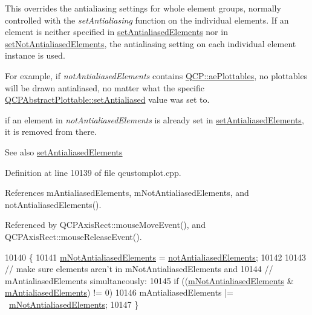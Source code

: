 This overrides the antialiasing settings for whole element groups, normally controlled with the {\itshape set\+Antialiasing} function on the individual elements. If an element is neither specified in \hyperlink{class_q_custom_plot_af6f91e5eab1be85f67c556e98c3745e8}{set\+Antialiased\+Elements} nor in \hyperlink{class_q_custom_plot_ae10d685b5eabea2999fb8775ca173c24}{set\+Not\+Antialiased\+Elements}, the antialiasing setting on each individual element instance is used.

For example, if {\itshape not\+Antialiased\+Elements} contains \hyperlink{namespace_q_c_p_ae55dbe315d41fe80f29ba88100843a0ca4145e4251b0cf2dbedabeea0a38f84f6}{Q\+C\+P\+::ae\+Plottables}, no plottables will be drawn antialiased, no matter what the specific \hyperlink{class_q_c_p_layerable_a4fd43e89be4a553ead41652565ff0581}{Q\+C\+P\+Abstract\+Plottable\+::set\+Antialiased} value was set to.

if an element in {\itshape not\+Antialiased\+Elements} is already set in \hyperlink{class_q_custom_plot_af6f91e5eab1be85f67c556e98c3745e8}{set\+Antialiased\+Elements}, it is removed from there.

\begin{DoxySeeAlso}{See also}
\hyperlink{class_q_custom_plot_af6f91e5eab1be85f67c556e98c3745e8}{set\+Antialiased\+Elements} 
\end{DoxySeeAlso}


Definition at line 10139 of file qcustomplot.\+cpp.



References m\+Antialiased\+Elements, m\+Not\+Antialiased\+Elements, and not\+Antialiased\+Elements().



Referenced by Q\+C\+P\+Axis\+Rect\+::mouse\+Move\+Event(), and Q\+C\+P\+Axis\+Rect\+::mouse\+Release\+Event().


\begin{DoxyCode}
10140                                                           \{
10141   \hyperlink{class_q_custom_plot_a2b6ebcad00a90ba07f146cefcd4293da}{mNotAntialiasedElements} = \hyperlink{class_q_custom_plot_a8060cee59757213764382a78d3196189}{notAntialiasedElements};
10142 
10143   \textcolor{comment}{// make sure elements aren't in mNotAntialiasedElements and}
10144   \textcolor{comment}{// mAntialiasedElements simultaneously:}
10145   \textcolor{keywordflow}{if} ((\hyperlink{class_q_custom_plot_a2b6ebcad00a90ba07f146cefcd4293da}{mNotAntialiasedElements} & \hyperlink{class_q_custom_plot_aa333200629256830e273873b582a5524}{mAntialiasedElements}) != 0)
10146     mAntialiasedElements |= ~\hyperlink{class_q_custom_plot_a2b6ebcad00a90ba07f146cefcd4293da}{mNotAntialiasedElements};
10147 \}
\end{DoxyCode}


